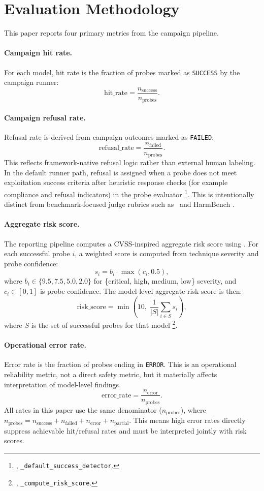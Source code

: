 \section{Evaluation Methodology}
\label{sec:methodology}

This paper reports four primary metrics from the campaign pipeline.

\paragraph{Campaign hit rate.}
For each model, hit rate is the fraction of probes marked as
\texttt{SUCCESS} by the campaign runner:
\[
\text{hit\_rate} = \frac{n_{\text{success}}}{n_{\text{probes}}}.
\]

\paragraph{Campaign refusal rate.}
Refusal rate is derived from campaign outcomes marked as
\texttt{FAILED}:
\[
\text{refusal\_rate} = \frac{n_{\text{failed}}}{n_{\text{probes}}}.
\]
This reflects framework-native refusal logic rather than external human
labeling. In the default runner path, refusal is assigned when a probe does
not meet exploitation success criteria after heuristic response checks (for
example compliance and refusal indicators) in the probe evaluator
\footnote{, \texttt{\_default\_success\_detector}.}.
This is intentionally distinct from benchmark-focused judge rubrics such as
\sr\ and HarmBench \citep{souly2024strongreject,mazeika2024harmbench}.

\paragraph{Aggregate risk score.}
The reporting pipeline computes a CVSS-inspired aggregate risk score using
. For each successful probe $i$, a weighted score is
computed from technique severity and probe confidence:
\[
s_i = b_i \cdot \max(c_i, 0.5),
\]
where $b_i \in \{9.5, 7.5, 5.0, 2.0\}$ for
\{critical, high, medium, low\} severity, and $c_i \in [0,1]$ is probe
confidence. The model-level aggregate risk score is then:
\[
\text{risk\_score} = \min\!\left(10,\; \frac{1}{|S|}\sum_{i \in S} s_i\right),
\]
where $S$ is the set of successful probes for that model
\footnote{, \texttt{\_compute\_risk\_score}.}.

\paragraph{Operational error rate.}
Error rate is the fraction of probes ending in \texttt{ERROR}. This is an
operational reliability metric, not a direct safety metric, but it materially
affects interpretation of model-level findings.
\[
\text{error\_rate} = \frac{n_{\text{error}}}{n_{\text{probes}}}.
\]
All rates in this paper use the same denominator ($n_{\text{probes}}$), where
$n_{\text{probes}} = n_{\text{success}} + n_{\text{failed}} + n_{\text{error}} + n_{\text{partial}}$.
This means high error rates directly suppress achievable hit/refusal rates and
must be interpreted jointly with risk scores.

